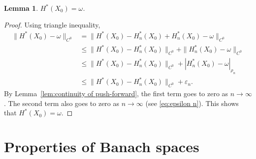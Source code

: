 \documentclass[12pt,reqno,a4paper]{amsart}%
\numberwithin{equation}{section}
\newtheorem{theorem}{Theorem}[section]
\newtheorem{lemma}[theorem]{Lemma}
\newcommand{\A}{{\mathcal A}}
\newcommand{\Tt}{{\mathbb{T}}}
\newcommand{\id}  {\operatorname{id}}
\newcommand{\rot}{\operatorname{rot}}
\def\vecalf{{\text{$\alpha$}}}
\begin{document}
\begin{lemma}
$H^*(X_0)=\omega$.
\end{lemma} 
\begin{proof}
Using triangle inequality,
\begin{align*}
\|H^*(X_0)-\omega\|_{C^0}&=\|H^*(X_0)-H_n^*(X_0)+H_n^*(X_0)-\omega\|_{C^0}\\
&\leq \|H^*(X_0)-H_n^*(X_0)\|_{C^0}+\|H_n^*(X_0)-\omega\|_{C^0}\\
&\leq \|H^*(X_0)-H_n^*(X_0)\|_{C^0}+|H_n^*(X_0)-\omega|_{\rho_n}\\
&\leq \|H^*(X_0)-H_n^*(X_0)\|_{C^0}+\varepsilon_n.
\end{align*}
By Lemma~\ref{lem:continuity of push-forward}, the first term goes to zero as $n\to\infty$.  The second term also goes to zero as $n\to\infty$ (see  \eqref{eq:epsilon n}). This shows that $H^*(X_0)=\omega.$
\end{proof}










\appendix

\section{Properties of Banach spaces}\label{banach spaces}
\end{document}
